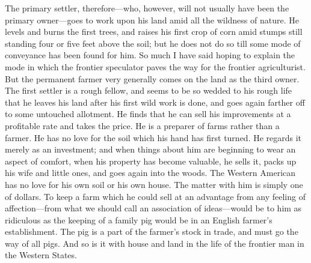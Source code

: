 The primary settler, therefore---who, however, will not usually have
been the primary owner---goes to work upon his land amid all the
wildness of nature.  He levels and burns the first trees, and
raises his first crop of corn amid stumps still standing four or
five feet above the soil; but he does not do so till some mode of
conveyance has been found for him.  So much I have said hoping to
explain the mode in which the frontier speculator paves the way for
the frontier agriculturist.  But the permanent farmer very
generally comes on the land as the third owner.  The first settler
is a rough fellow, and seems to be so wedded to his rough life that
he leaves his land after his first wild work is done, and goes
again farther off to some untouched allotment.  He finds that he
can sell his improvements at a profitable rate and takes the price.
He is a preparer of farms rather than a farmer.  He has no love for
the soil which his hand has first turned.  He regards it merely as
an investment; and when things about him are beginning to wear an
aspect of comfort, when his property has become valuable, he sells
it, packs up his wife and little ones, and goes again into the
woods.  The Western American has no love for his own soil or his
own house.  The matter with him is simply one of dollars.  To keep
a farm which he could sell at an advantage from any feeling of
affection---from what we should call an association of ideas---would
be to him as ridiculous as the keeping of a family pig would be in
an English farmer's establishment.  The pig is a part of the
farmer's stock in trade, and must go the way of all pigs.  And so
is it with house and land in the life of the frontier man in the
Western States.

